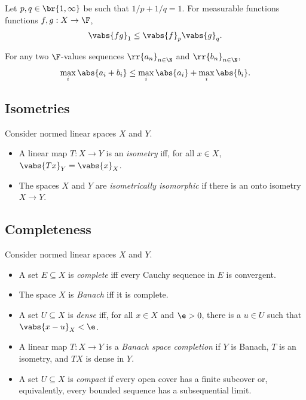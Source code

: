 \documentclass{article}
\begin{document}
\begin{theorem}
  Let $p,q\in \br{1,\infty}$ be such that $1/p+1/q=1$.
  For measurable functions functions $f,g:X\to\F$,
  \begin{align*}
    \vabs{fg}_{1} \leq \vabs{f}_{p}\vabs{g}_{q}.
  \end{align*}
\end{theorem}

\begin{theorem}
  \label{thm:minkowski-for-p-infinite}
  For any two $\F$-values sequences $ \rr{a_n}_{n\in\N}$ and $ \rr{b_n}_{n\in\N}$,
  \begin{align*}
    \max_i \abs{a_i + b_i} \leq \max_i \abs{a_i} + \max_i \abs{b_i}.
  \end{align*}
\end{theorem}

\subsection{Isometries}

\begin{definition}
  Consider normed linear spaces $X$ and $Y$.
  \begin{itemize}
    \item A linear map $T:X\to Y$ is an \emph{isometry} iff, for all $x\in X$,
      $\vabs{Tx}_{Y}=\vabs{x}_{X}$.
    \item The spaces $X$ and $Y$ are \emph{isometrically isomorphic} if
      there is an onto isometry $X\to Y$.
  \end{itemize}
\end{definition}

\subsection{Completeness}

\begin{definition}
  Consider normed linear spaces $X$ and $Y$.
  \begin{itemize}
    \item A set $E\subseteq X$ is \emph{complete}
      iff every Cauchy sequence in $E$ is convergent.
    \item The space $X$ is \emph{Banach} iff it is complete.
    \item A set $U\subseteq X$ is \emph{dense} iff, for all $x\in X$ and $\e>0$,
      there is a $u\in U$ such that $\vabs{x-u}_{X}<\e$.
    \item A linear map $T:X\to Y$ is a \emph{Banach space completion}
      if $Y$ is Banach, $T$ is an isometry, and $TX$ is dense in $Y$.
    \item A set $U\subseteq X$ is \emph{compact} if every open cover
      has a finite subcover or, equivalently, every bounded sequence has
      a subsequential limit.
  \end{itemize}
\end{definition}
\end{document}
